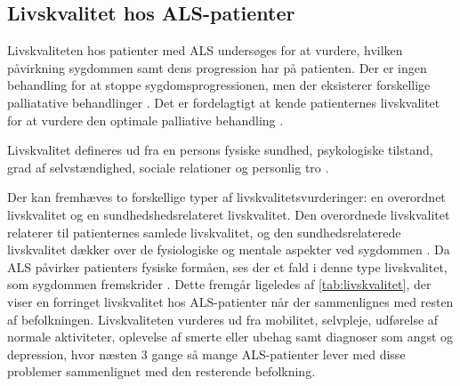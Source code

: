 \subsection{Livskvalitet hos ALS-patienter}
Livskvaliteten hos patienter med ALS undersøges for at vurdere, hvilken påvirkning sygdommen samt dens progression har på patienten. Der er ingen behandling for at stoppe sygdomsprogressionen, men der eksisterer forskellige palliatative behandlinger \citep{neudert2004}. Det er fordelagtigt at kende patienternes livskvalitet for at vurdere den optimale palliative behandling \citep{ilse2015}.

Livskvalitet defineres ud fra en persons fysiske sundhed, psykologiske tilstand, grad af selvstændighed, sociale relationer og personlig tro \citep{pagnini2013}.

Der kan fremhæves to forskellige typer af livskvalitetsvurderinger: en overordnet livskvalitet og en sundhedshedsrelateret livskvalitet. 
Den overordnede livskvalitet relaterer til patienternes samlede livskvalitet, og den sundhedsrelaterede livskvalitet dækker over de fysiologiske og mentale aspekter ved sygdommen \citep{ilse2015, neudert2004}. Da ALS påvirker patienters fysiske formåen, ses der et fald i denne type livskvalitet, som sygdommen fremskrider \citep{ilse2015}. Dette fremgår ligeledes af \autoref{tab:livskvalitet}, der viser en forringet livskvalitet hos ALS-patienter når der sammenlignes med resten af befolkningen. Livskvaliteten vurderes ud fra mobilitet, selvpleje, udførelse af normale aktiviteter, oplevelse af smerte eller ubehag samt diagnoser som angst og depression, hvor næsten 3 gange så mange ALS-patienter lever med disse problemer sammenlignet med den resterende befolkning.

